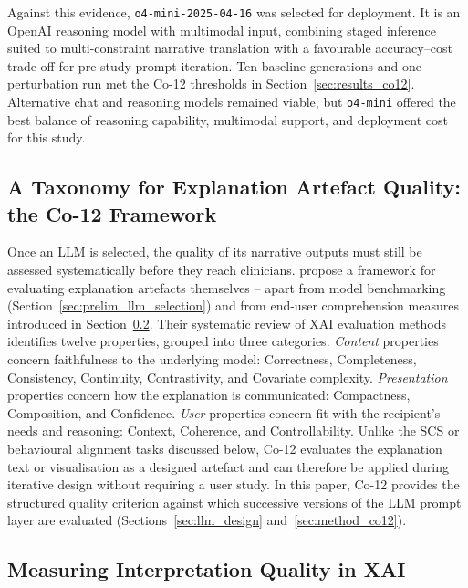 \documentclass[12pt, a4paper]{article}
\begin{document}
Against this evidence, \texttt{o4-mini-2025-04-16} was selected for
deployment.
It is an OpenAI reasoning model with multimodal input, combining staged
inference suited to multi-constraint narrative translation with a favourable
accuracy--cost trade-off for pre-study prompt iteration.
Ten baseline generations and one perturbation run met the Co-12 thresholds
in Section~\ref{sec:results_co12}.
Alternative chat and reasoning models remained viable, but \texttt{o4-mini}
offered the best balance of reasoning capability, multimodal support, and
deployment cost for this study.

\subsection{A Taxonomy for Explanation Artefact Quality: the Co-12 Framework}
\label{sec:prelim_co12}

Once an LLM is selected, the quality of its narrative outputs must still be
assessed systematically before they reach clinicians.
\citet{nauta2023anecdotal} propose a framework for evaluating explanation
artefacts themselves -- apart from model benchmarking
(Section~\ref{sec:prelim_llm_selection}) and from end-user comprehension
measures introduced in Section~\ref{sec:prelim_measurement}.
Their systematic review of XAI evaluation methods identifies twelve properties,
grouped into three categories.
\emph{Content} properties concern faithfulness to the underlying model:
Correctness, Completeness, Consistency, Continuity, Contrastivity,
and Covariate complexity.
\emph{Presentation} properties concern how the explanation is communicated:
Compactness, Composition, and Confidence.
\emph{User} properties concern fit with the recipient's needs and reasoning:
Context, Coherence, and Controllability.
Unlike the SCS or behavioural alignment tasks discussed below, Co-12 evaluates the
explanation text or visualisation as a designed artefact and can therefore be applied
during iterative design without requiring a user study.
In this paper, Co-12 provides the structured quality criterion against which successive
versions of the LLM prompt layer are evaluated
(Sections~\ref{sec:llm_design} and~\ref{sec:method_co12}).

\subsection{Measuring Interpretation Quality in XAI}
\label{sec:prelim_measurement}
\end{document}
